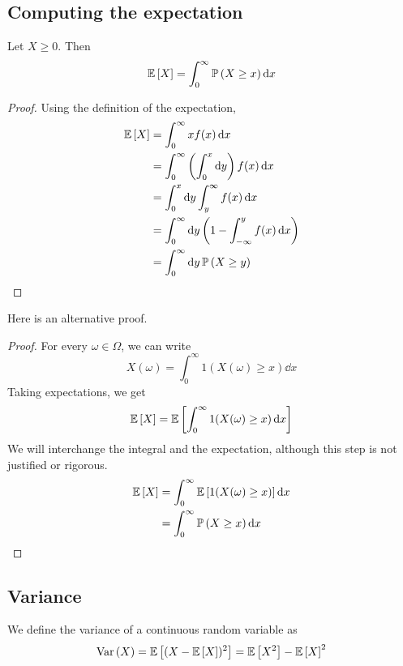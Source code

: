\subsection{Computing the expectation}
\begin{claim}
	Let \(X \geq 0\).
	Then
	\[
		\mathbb{E}\left[{X}\right] = \int_0^\infty \mathbb{P}\left({X \geq x}\right) \dd{x}
	\]
\end{claim}
\begin{proof}
	Using the definition of the expectation,
	\begin{align*}
		\mathbb{E}\left[{X}\right] & = \int_0^\infty xf(x) \dd{x}                                           \\
		           & = \int_0^\infty \left( \int_0^x \dd{y} \right) f(x) \dd{x}             \\
		           & = \int_0^x \dd{y} \int_y^\infty f(x) \dd{x}                            \\
		           & = \int_0^\infty \dd{y} \left( 1 - \int_{-\infty}^y f(x) \dd{x} \right) \\
		           & = \int_0^\infty \dd{y} \mathbb{P}\left({X \geq y}\right)
	\end{align*}
\end{proof}
Here is an alternative proof.
\begin{proof}
	For every \(\omega \in \Omega\), we can write
	\[
		X(\omega) = \int_0^\infty 1(X(\omega) \geq x) \dd{x}
	\]
	Taking expectations, we get
	\[
		\mathbb{E}\left[{X}\right] = \mathbb{E}\left[{\int_0^\infty 1(X(\omega) \geq x) \dd{x}}\right]
	\]
	We will interchange the integral and the expectation, although this step is not justified or rigorous.
	\begin{align*}
		\mathbb{E}\left[{X}\right] & = \int_0^\infty \mathbb{E}\left[{1(X(\omega) \geq x)}\right] \dd{x} \\
		           & = \int_0^\infty \mathbb{P}\left({X \geq x}\right) \dd{x}
	\end{align*}
\end{proof}

\subsection{Variance}
We define the variance of a continuous random variable as
\[
	\operatorname{Var}\left({X}\right) = \mathbb{E}\left[{(X - \mathbb{E}\left[{X}\right])^2}\right] = \mathbb{E}\left[{X^2}\right] - \mathbb{E}\left[{X}\right]^2
\]

